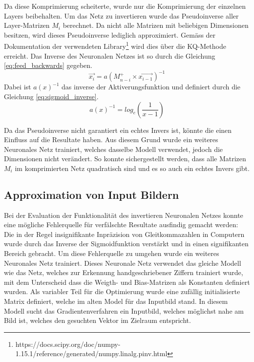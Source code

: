 \documentclass[Interploate_hadwritten_Digits.tex]{subfiles}
\begin{document}
	Da diese Komprimierung scheiterte, wurde nur die Komprimierung der einzelnen Layers beibehalten. Um das Netz zu invertieren wurde das Pseudoinverse aller Layer-Matrizen $ M_{i} $ berechnet. Da nicht alle Matrizen mit beliebigen Dimensionen besitzen, wird dieses Pseudoinverse lediglich approximiert. Gemäss der Dokumentation der verwendeten Library\footnote{ https://docs.scipy.org/doc/numpy-1.15.1/reference/generated/numpy.linalg.pinv.html} wird dies über die KQ-Methode erreicht. Das Inverse des Neuronalen Netzes ist so durch die Gleichung \ref{eq:feed_backwards} gegeben.
	\begin{equation}
		\vec{x_{i}} = a(M_{n-i}^{+} \times \vec{x_{i-1}})^{-1}
		\label{eq:feed_backwards}
	\end{equation}
	Dabei ist $ a(x)^{-1} $ das inverse der Aktiverungsfunktion und definiert durch die Gleichung \ref{eq:sigmoid_inverse}.
	\begin{equation}
		a(x)^{-1} = log_{e}(\frac{1}{x - 1})
		\label{eq:sigmoid_inverse}
	\end{equation}
	
	Da das Pseudoinverse nicht garantiert ein echtes Invers ist, könnte die einen Einfluss auf die Resultate haben. Aus diesem Grund wurde ein weiteres Neuronales Netz trainiert, welches dasselbe Modell verwendet, jedoch die Dimensionen nicht verändert. So konnte sichergestellt werden, dass alle Matrizen $ M_{i} $ im komprimierten Netz quadratisch sind und es so auch ein echtes Invers gibt.
	
	\subsection{Approximation von Input Bildern}
	Bei der Evaluation der Funktionalität des invertieren Neuronalen Netzes konnte eine mögliche Fehlerquelle für verfälschte Resultate ausfindig gemacht werden: Die in der Regel insignifikante Inpräzision von Gleitkommazahlen in Computern wurde durch das Inverse der Sigmoidfunktion verstärkt und in einen signifikanten Bereich gebracht. Um diese Fehlerquelle zu umgehen wurde ein weiteres Neuronales Netz trainiert. Dieses Neuronale Netz verwendet das gleiche Modell wie das Netz, welches zur Erkennung handgeschriebener Ziffern trainiert wurde, mit dem Unterscheid dass die Weigth- und Bias-Matrizen als Konstanten definiert wurden. Als variabler Teil für die Optimierung wurde eine zufällig initialisierte Matrix definiert, welche im alten Model für das Inputbild stand. In diesem Modell sucht das Gradientenverfahren ein Inputbild, welches möglichst nahe am Bild ist, welches den gesuchten Vektor im Zielraum entspricht.
	
\end{document}

